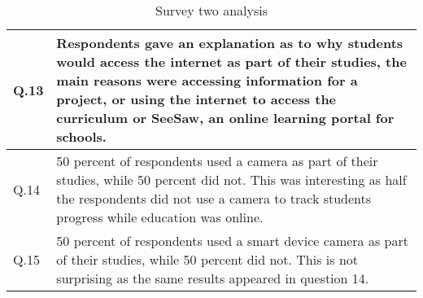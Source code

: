 \begin{table} [b]
\begin{tabular}{ | m{3em} | m{10cm}| }
Q.13 & Respondents gave an explanation as to why students would access the internet as part of their studies, the main reasons were accessing information for a project, or using the internet to access the curriculum or SeeSaw, an online learning portal for schools.  \\
\hline
Q.14 & 50 percent of respondents used a camera as part of their studies, while 50 percent did not. This was interesting as half the respondents did not use a camera to track students progress while education was online.  \\
\hline
Q.15 & 50 percent of respondents used a smart device camera as part of their studies, while 50 percent did not. This is not surprising as the same results appeared in question 14.  \\
\hline
\end{tabular}
\centering

\caption{Survey two analysis}
    \label{tab:my_label}
\end{table}




